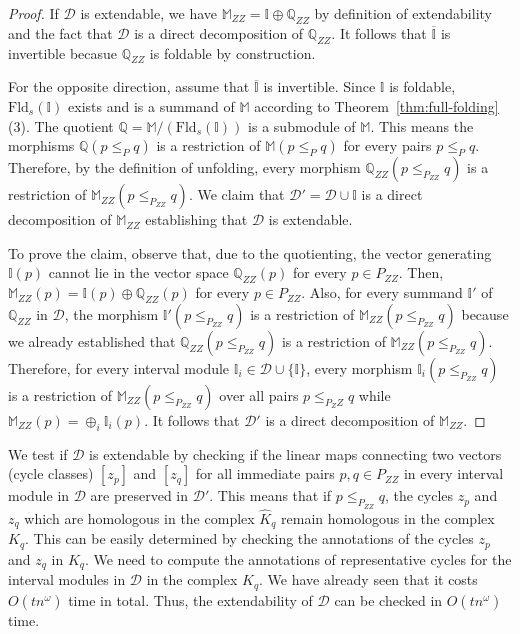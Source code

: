 \documentclass[11pt]{article}
\theoremstyle{plain}%
\newcommand{\Int}{\mathbb{I}}
\newcommand{\M}{\mathbb{M}}
\newcommand{\Q}{\mathbb{Q}}
\newcommand{\D}{\mathcal{D}}
\newcommand{\Fld}{\mathrm{Fld}}
\begin{document}
\begin{proof}
    If $\D$ is extendable, we have $\M_{ZZ}=\Int\oplus \Q_{ZZ}$ by definition of
    extendability and the fact that $\D$ is a direct decomposition of $\Q_{ZZ}$.
    It follows that $\overline{\Int}$ is
    invertible becasue $\Q_{ZZ}$ is foldable by construction.

    For the opposite direction, assume that $\overline{\Int}$ is invertible.
    Since $\Int$ is foldable, $\Fld_s(\Int)$ exists and is a summand of
    $\M$ according to Theorem~\ref{thm:full-folding}(3). The quotient
    $\Q=\M/(\Fld_s(\Int))$ is a submodule of $\M$. This means the morphisms 
    $\Q(p\leq_P q)$ is a restriction of $\M(p\leq_P q)$ for every pairs $p\leq_P q$.
    Therefore, by the definition of unfolding, every morphism
    $\Q_{ZZ}(p\leq_{P_{ZZ}} q)$ is a restriction of $\M_{ZZ}(p\leq_{P_{ZZ}}q)$.
    We claim that $\D'=\D\cup{\Int}$ is a direct decomposition of $\M_{ZZ}$ establishing that $\D$ is extendable.

    To prove the claim, observe that, due to the quotienting, the vector generating $\Int(p)$ cannot lie in the vector space $\Q_{ZZ}(p)$ for every $p\in P_{ZZ}$. 
    Then, $\M_{ZZ}(p)=\Int(p)\oplus \Q_{ZZ}(p)$ for every $p\in P_{ZZ}$. Also, for
    every summand $\Int'$ of $\Q_{ZZ}$ in $\D$, the morphism $\Int'(p\leq_{P_{ZZ}} q)$ 
    is a restriction of $\M_{ZZ}(p\leq_{P_{ZZ}} q)$ because we already established
    that $\Q_{ZZ}(p\leq_{P_{ZZ}} q)$ is a restriction of $\M_{ZZ}(p\leq_{P_{ZZ}}q)$. Therefore, for every interval module $\Int_i\in \D\cup \{\Int\}$, every morphism $\Int_i(p\leq_{P_{ZZ}} q)$
    is a restriction of $\M_{ZZ}(p\leq_{P_{ZZ}} q)$ over all pairs $p\leq_{P_ZZ} q$
    while $\M_{ZZ}(p)=\oplus_i \Int_i(p)$. It follows that $\D'$ is a direct decomposition of $\M_{ZZ}$. 
   \end{proof}
We test if $\D$ is extendable by checking if the linear maps
connecting two vectors (cycle classes) $[z_p]$ and $[z_q]$ for all immediate
pairs $p,q\in P_{ZZ}$ in every interval module in $\D$ are preserved in
$\D'$. This means that if $p\leq_{P_{ZZ}} q$, the cycles $z_p$ and $z_q$ which
are homologous in the complex $\hat{K}_q$ remain
homologous in the complex $K_q$. This can be easily determined by checking the
annotations of the cycles $z_p$ and $z_q$ in $K_q$. We need to compute the
annotations of representative cycles for the interval modules in $\D$ 
in the complex $K_q$.
We have already seen that it costs $O(tn^{\omega})$ time in total. Thus, the extendability
of $\D$ can be checked in $O(tn^{\omega})$ time.
\end{document}
